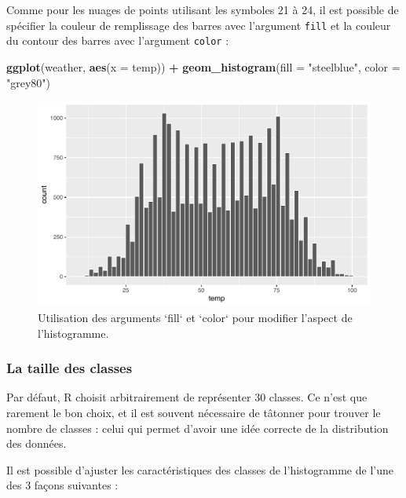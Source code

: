 \documentclass[a4paperpaper,]{article}
\newenvironment{Shaded}{\begin{snugshade}}{\end{snugshade}}
\newcommand{\KeywordTok}[1]{\textcolor[rgb]{0.13,0.29,0.53}{\textbf{#1}}}
\newcommand{\DataTypeTok}[1]{\textcolor[rgb]{0.13,0.29,0.53}{#1}}
\newcommand{\StringTok}[1]{\textcolor[rgb]{0.31,0.60,0.02}{#1}}
\newcommand{\OperatorTok}[1]{\textcolor[rgb]{0.81,0.36,0.00}{\textbf{#1}}}
\newcommand{\NormalTok}[1]{#1}
\theoremstyle{definition}
\theoremstyle{definition}
\theoremstyle{definition}
\theoremstyle{remark}
\begin{document}
Comme pour les nuages de points utilisant les symboles 21 à 24, il est
possible de spécifier la couleur de remplissage des barres avec
l'argument \texttt{fill} et la couleur du contour des barres avec
l'argument \texttt{color} :

\begin{Shaded}
\begin{Highlighting}[]
\KeywordTok{ggplot}\NormalTok{(weather, }\KeywordTok{aes}\NormalTok{(}\DataTypeTok{x =}\NormalTok{ temp)) }\OperatorTok{+}
\StringTok{  }\KeywordTok{geom_histogram}\NormalTok{(}\DataTypeTok{fill =} \StringTok{"steelblue"}\NormalTok{, }\DataTypeTok{color =} \StringTok{"grey80"}\NormalTok{)}
\end{Highlighting}
\end{Shaded}

\begin{figure}[htpb]

{\centering \includegraphics[width=0.9\linewidth]{figure/unnamed-chunk-48-1} 

}

\caption{Utilisation des arguments `fill` et `color` pour modifier l'aspect de l'histogramme.}\label{fig:unnamed-chunk-48}
\end{figure}

\subsubsection{La taille des classes}\label{la-taille-des-classes}

Par défaut, R choisit arbitrairement de représenter 30 classes. Ce n'est
que rarement le bon choix, et il est souvent nécessaire de tâtonner pour
trouver le nombre de classes : celui qui permet d'avoir une idée
correcte de la distribution des données.

Il est possible d'ajuster les caractéristiques des classes de
l'histogramme de l'une des 3 façons suivantes :
\end{document}
